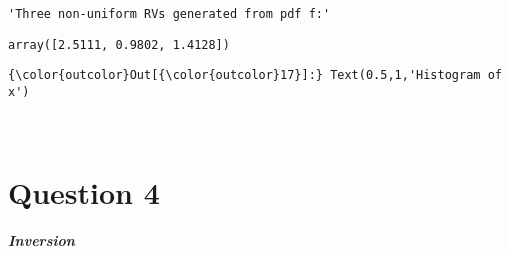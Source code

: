 \documentclass[11pt]{article}
\begin{document}
    
    \begin{verbatim}
'Three non-uniform RVs generated from pdf f:'
    \end{verbatim}

    
    
    \begin{verbatim}
array([2.5111, 0.9802, 1.4128])
    \end{verbatim}

    
\begin{Verbatim}[commandchars=\\\{\}]
{\color{outcolor}Out[{\color{outcolor}17}]:} Text(0.5,1,'Histogram of x')
\end{Verbatim}
            
    \begin{center}
    \end{center}
    { \hspace*{\fill} \\}
    
    \section*{Question 4}

    \textbf{\emph{Inversion}}
\end{document}
